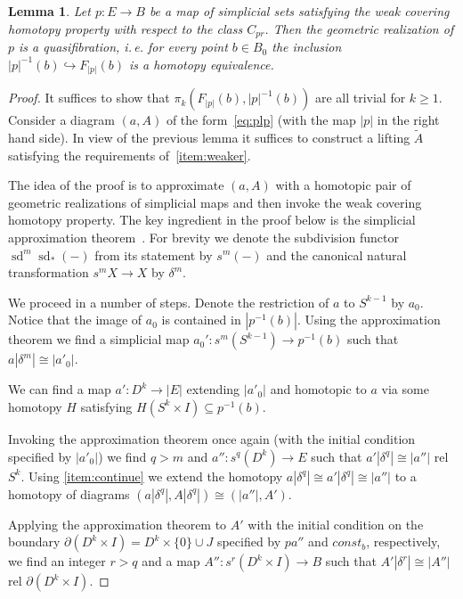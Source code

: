 \documentclass[oneside, 10pt]{amsart}
\theoremstyle{plain}
\numberwithin{equation}{section}
\newtheorem{lemma}{Lemma}
\numberwithin{lemma}{section}
\theoremstyle{remark}
\theoremstyle{definition}
\DeclareMathOperator{\sd}{sd}
\begin{document}
\begin{lemma} \label{lm:weak-equiv} Let $p\colon E \to B$ be a map of simplicial sets satisfying the weak covering homotopy property with respect to the class $C_{pr}$.
 Then the geometric realization of $p$ is a quasifibration, i.\,e. for every point $b \in B_0$ the inclusion $|p|^{-1}(b) \hookrightarrow F_{|p|}(b)$ is a homotopy equivalence. \end{lemma}
\begin{proof}

 It suffices to show that $\pi_k(F_{|p|}(b), |p|^{-1}(b))$ are all trivial for $k \geq 1$.
 Consider a diagram $(a, A)$ of the form~\eqref{eq:plp} (with the map $|p|$ in the right hand side). 
 In view of the previous lemma it suffices to construct a lifting $\widetilde{A}$ satisfying the requirements of~\cref{item:weaker}.
 
 The idea of the proof is to approximate $(a, A)$ with a homotopic pair of geometric realizations of simplicial maps and then invoke the weak covering homotopy property. 
 The key ingredient in the proof below is the simplicial approximation theorem~\cite[Theorem~4.7]{Jar04}.
 For brevity we denote the subdivision functor $\sd^m\sd_*(-)$ from its statement by $s^m(-)$ and the canonical natural transformation $s^m X \to X$ by $\delta^m$.
 
 We proceed in a number of steps.
 Denote the restriction of $a$ to $S^{k-1}$ by $a_0$.
 Notice that the image of $a_0$ is contained in $|p^{-1}(b)|$.
 Using the approximation theorem we find a simplicial map $a_0'\colon s^m (S^{k-1}) \to p^{-1}(b)$ such that $a|\delta^m| \cong |a'_0|$.     
 
 We can find a map $a'\colon D^k\to |E|$ extending $|a'_0|$ and homotopic to $a$ via some homotopy $H$ satisfying $H(S^k\times I) \subseteq p^{-1}(b)$.
 
 Invoking the approximation theorem once again (with the initial condition specified by $|a'_0|$) we find $q>m$ and $a''\colon s^{q}(D^k) \to E$
 such that $a'|\delta^{q}| \cong |a''|$ rel $S^k$.
 Using \cref{item:continue} we extend the homotopy $a |\delta^q| \cong a'|\delta^q| \cong |a''|$ to a homotopy of diagrams $(a|\delta^q|, A|\delta^q|) \cong (|a''|, A')$.
 
 Applying the approximation theorem to $A'$ with the initial condition on the boundary $\partial (D^k \times I) = D^k\times \{0\} \cup J$ specified by 
 $pa''$ and $const_b$, respectively, we find an integer $r>q$ and a map $A''\colon s^{r}(D^k \times I) \to B$ such that
 $A'|\delta^r|\cong |A''|$ rel $\partial (D^k \times I)$.
 

\end{proof}
\end{document}
